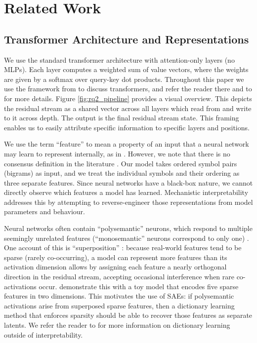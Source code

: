 \section{Related Work}\label{s:related-work}


\subsection*{Transformer Architecture and Representations}

We use the standard transformer architecture \citep{vaswani2017attention} 
with attention-only layers (no MLPs). Each layer computes a weighted sum of value vectors, where the weights are given by a softmax over query-key dot products. 
Throughout this paper we use the framework from \citet{elhage2021mathematical} to discuss transformers, and refer the reader there and to \citet{ferrando2024primer} for more details. Figure \ref{fig:rq2_pipeline} provides a visual overview. This depicts the residual stream as a shared vector across all layers which read from and write to it across depth. The output is the final residual stream state. This framing enables us to easily attribute specific information to specific layers and positions.

We use the term ``feature'' to mean a property of an input that a neural network may learn to represent internally, as in \cite{wattenberg2024relational}. However, we note that there is no consensus definition in the literature \cite{elhage2022toy,wattenberg2024relational}.
Our model takes ordered symbol pairs (bigrams) as input, and we treat the individual symbols and their ordering as three separate features. Since neural networks have a black-box nature, we cannot directly observe which features a model has learned. Mechanistic interpretability addresses this by attempting to reverse-engineer those representations from model parameters and behaviour.

Neural networks often contain ``polysemantic'' neurons, which respond to multiple seemingly unrelated features (``monosemantic'' neurons correspond to only one) \citep{olah2020zoom}. One account of this is ``superposition'' \citep{elhage2022toy}: because 
real-world features tend to be sparse (rarely co-occurring), a model 
can represent more features than its activation dimension allows by 
assigning each feature a nearly orthogonal direction in the residual 
stream, accepting occasional interference when rare co-activations 
occur. \citet{elhage2022toy} demonstrate this with a toy model that 
encodes five sparse features in two dimensions. This motivates 
the use of SAEs: if polysemantic activations arise from superposed 
sparse features, then a dictionary learning method that enforces 
sparsity should be able to recover those features as separate latents. We refer the reader to \cite{faruqui-etal-2015-sparse, arora-etal-2018-linear, Subramanian_Pruthi_Jhamtani_Berg-Kirkpatrick_Hovy_2018, yun-etal-2021-transformer} for more information on dictionary learning outside of interpretability.

